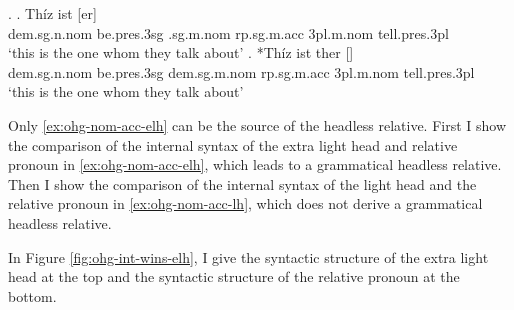 \ex.\label{ex:ohg-nom-acc-rep}
\ag. Thíz ist [er]   \\
\ac{dem}.\ac{sg}.\ac{n}.\ac{nom} be.\ac{pres}.3\ac{sg}\scsub{[nom]} .\ac{sg}.\ac{m}.\ac{nom} \ac{rp}.\ac{sg}.\ac{m}.\ac{acc} 3\ac{pl}.\ac{m}.\ac{nom} tell.\ac{pres}.3\ac{pl}\scsub{[acc]}\\
`this is the one whom they talk about' \label{ex:ohg-nom-acc-elh}
\bg. *Thíz ist ther []  \\
\ac{dem}.\ac{sg}.\ac{n}.\ac{nom} be.\ac{pres}.3\ac{sg}\scsub{[nom]} \ac{dem}.\ac{sg}.\ac{m}.\ac{nom} \ac{rp}.\ac{sg}.\ac{m}.\ac{acc} 3\ac{pl}.\ac{m}.\ac{nom} tell.\ac{pres}.3\ac{pl}\scsub{[acc]}\\
`this is the one whom they talk about' \label{ex:ohg-nom-acc-lh}

Only \ref{ex:ohg-nom-acc-elh} can be the source of the headless relative. First I show the comparison of the internal syntax of the extra light head and relative pronoun in \ref{ex:ohg-nom-acc-elh}, which leads to a grammatical headless relative. Then I show the comparison of the internal syntax of the light head and the relative pronoun in \ref{ex:ohg-nom-acc-lh}, which does not derive a grammatical headless relative.

In Figure \ref{fig:ohg-int-wins-elh}, I give the syntactic structure of the extra light head at the top and the syntactic structure of the relative pronoun at the bottom.

